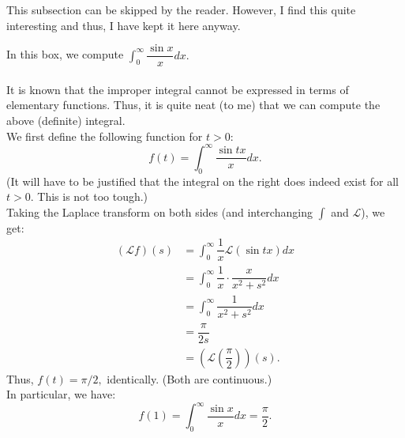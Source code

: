 
This subsection can be skipped by the reader. However, I find this quite interesting and thus, I have kept it here anyway.
\begin{mdframed}[style=boxstyle, frametitle={The sinc integral}]
	In this box, we compute $\displaystyle\int_{0}^{\infty} \dfrac{\sin x}{x} dx.$\\~\\
	It is known that the improper integral cannot be expressed in terms of elementary functions. Thus, it is quite neat (to me) that we can compute the above (definite) integral.\\
	We first define the following function for $t > 0:$
	\begin{equation*} 
		f(t) = \int_{0}^{\infty} \dfrac{\sin tx}{x} dx.
	\end{equation*}
	(It will have to be justified that the integral on the right does indeed exist for all $t > 0$. This is not too tough.)\\
	Taking the Laplace transform on both sides (and interchanging $\int$ and $\mathcal{L}$), we get:
	\begin{align*} 
		(\mathcal{L}f)(s) &= \int_{0}^{\infty} \dfrac{1}{x} \mathcal{L}(\sin tx) dx\\
		&= \int_{0}^{\infty} \dfrac{1}{x}\cdot\dfrac{x}{x^2 + s^2} dx\\
		&= \int_{0}^{\infty} \dfrac{1}{x^2 + s^2} dx\\
		&= \dfrac{\pi}{2s}\\
		&= \left(\mathcal{L}\left(\dfrac{\pi}{2}\right)\right)(s).
	\end{align*}
	Thus, $f(t) = \pi/2,$ identically. (Both are continuous.)\\
	In particular, we have:
	\begin{equation*} 
		f(1) = \int_{0}^{\infty} \dfrac{\sin x}{x} dx = \dfrac{\pi}{2}.
	\end{equation*}
\end{mdframed}
